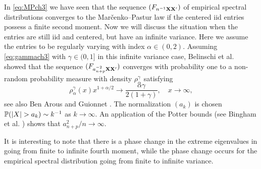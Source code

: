 In \eqref{eq:MPch3} we have seen that the sequence $(F_{n^{-1}{\mathbf X} {\mathbf X}'})$ of empirical spectral distributions converges to the Mar\v cenko--Pastur law if the centered iid entries possess a finite second moment. Now we will discuss the situation when the entries are still iid and centered, but have an infinite variance. Here we assume the entries to be regularly varying with index $\alpha \in (0,2)$.
Assuming \eqref{eq:gammach3} with $\gamma\in (0,1]$ in this infinite variance case, Belinschi et al.~\cite[Theorem~1.10]{belinschi:dembo:guionnet:2009} showed that the sequence $(F_{a_{n+p}^{-2}{\mathbf X} {\mathbf X}'})$ converges with probability one to a non-random probability measure with density $\rho_{\alpha}^\gamma$ satisfying
\begin{equation*}
\rho_{\alpha}^\gamma(x) x^{1+\alpha/2} \to \frac{\alpha \gamma}{2(1+\gamma)}, \quad x \to \infty,
\end{equation*}
see also Ben Arous and Guionnet \cite[Theorem~1.6]{arous:guionnet:2008}.
The normalization $(a_k)$ is chosen \sth\ $\P(|X|>a_k)\sim k^{-1}$ as $k\to\infty$. An application of the Potter bounds (see Bingham et al. \cite[p.~25]{bingham:goldie:teugels:1987}) shows that $a_{n+p}^2/n \to \infty$.



It is interesting to note that there is a phase change in the extreme eigenvalues in going from finite to infinite fourth moment, while the phase change occurs for the empirical spectral distribution going from finite to infinite variance.

\par






